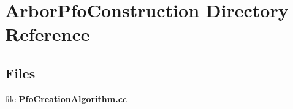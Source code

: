 \section{Arbor\+Pfo\+Construction Directory Reference}
\label{dir_88efa7ce72594e5546463067485308d9}
\subsection*{Files}
\begin{DoxyCompactItemize}
\item 
file {\bf Pfo\+Creation\+Algorithm.\+cc}
\end{DoxyCompactItemize}
